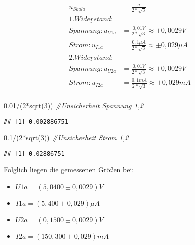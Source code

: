\documentclass[
  9pt,
]{article}
\newenvironment{Shaded}{\begin{snugshade}}{\end{snugshade}}
\newcommand{\CommentTok}[1]{\textcolor[rgb]{0.56,0.35,0.01}{\textit{#1}}}
\newcommand{\DecValTok}[1]{\textcolor[rgb]{0.00,0.00,0.81}{#1}}
\newcommand{\FloatTok}[1]{\textcolor[rgb]{0.00,0.00,0.81}{#1}}
\newcommand{\FunctionTok}[1]{\textcolor[rgb]{0.00,0.00,0.00}{#1}}
\newcommand{\NormalTok}[1]{#1}
\newcommand{\SpecialCharTok}[1]{\textcolor[rgb]{0.00,0.00,0.00}{#1}}
\begin{document}
\begin{equation*}
\begin{split}
u_{Skala} &=\frac{a}{2*\sqrt{3}} \\
\underline{1.Widerstand:} \\
Spannung: u_{U1a} &= \frac{0,01V}{2*\sqrt{3}} \approx \pm 0,0029 V \\
Strom: u_{I1a} &= \frac{0,1\mu A}{2*\sqrt{3}} \approx \pm 0,029\mu A \\
\underline{2.Widerstand:} \\
Spannung: u_{U2a} &= \frac{0,01V}{2*\sqrt{3}} \approx \pm 0,0029 V \\
Strom: u_{I2a} &= \frac{0,1mA}{2*\sqrt{3}} \approx \pm 0,029 mA \\
\end{split}
\end{equation*}

\begin{Shaded}
\begin{Highlighting}[]
\FloatTok{0.01}\SpecialCharTok{/}\NormalTok{(}\DecValTok{2}\SpecialCharTok{*}\FunctionTok{sqrt}\NormalTok{(}\DecValTok{3}\NormalTok{)) }\CommentTok{\#Unsicherheit Spannung 1,2}
\end{Highlighting}
\end{Shaded}

\begin{verbatim}
## [1] 0.002886751
\end{verbatim}

\begin{Shaded}
\begin{Highlighting}[]
\FloatTok{0.1}\SpecialCharTok{/}\NormalTok{(}\DecValTok{2}\SpecialCharTok{*}\FunctionTok{sqrt}\NormalTok{(}\DecValTok{3}\NormalTok{)) }\CommentTok{\#Unsicherheit Strom 1,2}
\end{Highlighting}
\end{Shaded}

\begin{verbatim}
## [1] 0.02886751
\end{verbatim}

Folglich liegen die gemessenen Größen bei:

\begin{itemize}
\item $U1a = (5,0400 \pm 0,0029)V$
\item $I1a = (5,400 \pm 0,029) \mu A$
\item $U2a = (0,1500 \pm 0,0029)V$
\item $I2a = (150,300 \pm 0,029) mA$
\end{itemize}
\end{document}

